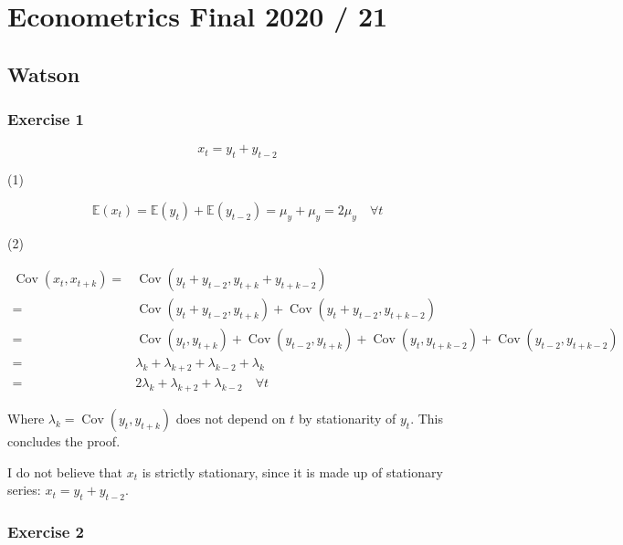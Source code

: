 \section{Econometrics Final 2020 / 21}

{
\subsection*{Watson}

{
\subsubsection*{Exercise 1}

\begin{enumerate}[label=(\alph*)]
{\item 
$$
x_{t}=y_{t}+y_{t-2}
$$

(1) 

$$
\mathbb{E}\left(x_{t}\right)=\mathbb{E}\left(y_{t}\right)+\mathbb{E}\left(y_{t-2}\right)=\mu_{y}+\mu_{y}=2 \mu_{y} \quad \forall t
$$

(2)

$$
\begin{aligned}
\operatorname{Cov}\left(x_{t}, x_{t+k}\right)= & \operatorname{Cov}\left(y_{t}+y_{t-2}, y_{t+k}+y_{t+k-2}\right) \\
= & \operatorname{Cov}\left(y_{t}+y_{t-2}, y_{t+k}\right) +\operatorname{Cov}\left(y_{t}+y_{t-2}, y_{t+k-2}\right) \\
= & \operatorname{Cov}\left(y_{t}, y_{t+k}\right)+\operatorname{Cov}\left(y_{t-2}, y_{t+k}\right) +\operatorname{Cov}\left(y_{t}, y_{t+k-2}\right)+\operatorname{Cov}\left(y_{t-2}, y_{t+k-2}\right) \\
= & \lambda_{k}+\lambda_{k+2}+\lambda_{k-2}+\lambda_{k} \\
= & 2 \lambda_{k}+\lambda_{k+2}+\lambda_{k-2} \quad \forall t
\end{aligned}
$$

Where $\lambda_{k}=\operatorname{Cov}\left(y_{t}, y_{t+k}\right)$ does not depend on $t$ by stationarity of $y_{t}$. This concludes the proof.
}
{\item 
I do not believe that $x_{t}$ is strictly stationary, since it is made up of stationary series: $x_{t}=y_{t}+y_{t-2}$.
}
\end{enumerate}
}
{
\subsubsection*{Exercise 2}

}}
